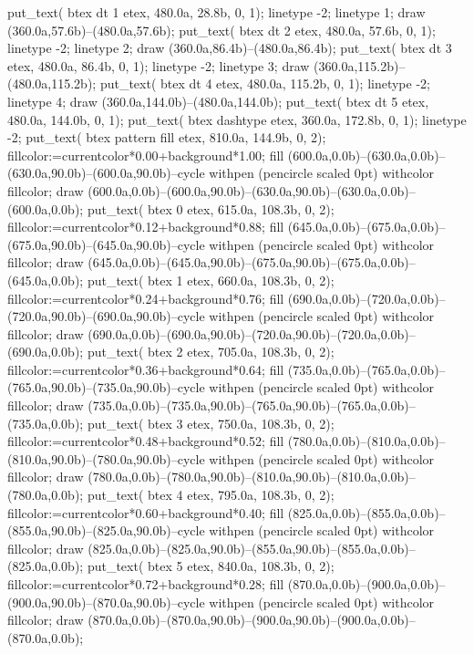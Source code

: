 put_text( btex   dt 1 etex, 480.0a, 28.8b, 0, 1);
linetype -2;
linetype 1;
draw (360.0a,57.6b)--(480.0a,57.6b);
put_text( btex   dt 2 etex, 480.0a, 57.6b, 0, 1);
linetype -2;
linetype 2;
draw (360.0a,86.4b)--(480.0a,86.4b);
put_text( btex   dt 3 etex, 480.0a, 86.4b, 0, 1);
linetype -2;
linetype 3;
draw (360.0a,115.2b)--(480.0a,115.2b);
put_text( btex   dt 4 etex, 480.0a, 115.2b, 0, 1);
linetype -2;
linetype 4;
draw (360.0a,144.0b)--(480.0a,144.0b);
put_text( btex   dt 5 etex, 480.0a, 144.0b, 0, 1);
put_text( btex dashtype etex, 360.0a, 172.8b, 0, 1);
linetype -2;
put_text( btex pattern fill etex, 810.0a, 144.9b, 0, 2);
fillcolor:=currentcolor*0.00+background*1.00;
fill (600.0a,0.0b)--(630.0a,0.0b)--(630.0a,90.0b)--(600.0a,90.0b)--cycle withpen (pencircle scaled 0pt) withcolor fillcolor;
draw (600.0a,0.0b)--(600.0a,90.0b)--(630.0a,90.0b)--(630.0a,0.0b)--(600.0a,0.0b);
put_text( btex  0 etex, 615.0a, 108.3b, 0, 2);
fillcolor:=currentcolor*0.12+background*0.88;
fill (645.0a,0.0b)--(675.0a,0.0b)--(675.0a,90.0b)--(645.0a,90.0b)--cycle withpen (pencircle scaled 0pt) withcolor fillcolor;
draw (645.0a,0.0b)--(645.0a,90.0b)--(675.0a,90.0b)--(675.0a,0.0b)--(645.0a,0.0b);
put_text( btex  1 etex, 660.0a, 108.3b, 0, 2);
fillcolor:=currentcolor*0.24+background*0.76;
fill (690.0a,0.0b)--(720.0a,0.0b)--(720.0a,90.0b)--(690.0a,90.0b)--cycle withpen (pencircle scaled 0pt) withcolor fillcolor;
draw (690.0a,0.0b)--(690.0a,90.0b)--(720.0a,90.0b)--(720.0a,0.0b)--(690.0a,0.0b);
put_text( btex  2 etex, 705.0a, 108.3b, 0, 2);
fillcolor:=currentcolor*0.36+background*0.64;
fill (735.0a,0.0b)--(765.0a,0.0b)--(765.0a,90.0b)--(735.0a,90.0b)--cycle withpen (pencircle scaled 0pt) withcolor fillcolor;
draw (735.0a,0.0b)--(735.0a,90.0b)--(765.0a,90.0b)--(765.0a,0.0b)--(735.0a,0.0b);
put_text( btex  3 etex, 750.0a, 108.3b, 0, 2);
fillcolor:=currentcolor*0.48+background*0.52;
fill (780.0a,0.0b)--(810.0a,0.0b)--(810.0a,90.0b)--(780.0a,90.0b)--cycle withpen (pencircle scaled 0pt) withcolor fillcolor;
draw (780.0a,0.0b)--(780.0a,90.0b)--(810.0a,90.0b)--(810.0a,0.0b)--(780.0a,0.0b);
put_text( btex  4 etex, 795.0a, 108.3b, 0, 2);
fillcolor:=currentcolor*0.60+background*0.40;
fill (825.0a,0.0b)--(855.0a,0.0b)--(855.0a,90.0b)--(825.0a,90.0b)--cycle withpen (pencircle scaled 0pt) withcolor fillcolor;
draw (825.0a,0.0b)--(825.0a,90.0b)--(855.0a,90.0b)--(855.0a,0.0b)--(825.0a,0.0b);
put_text( btex  5 etex, 840.0a, 108.3b, 0, 2);
fillcolor:=currentcolor*0.72+background*0.28;
fill (870.0a,0.0b)--(900.0a,0.0b)--(900.0a,90.0b)--(870.0a,90.0b)--cycle withpen (pencircle scaled 0pt) withcolor fillcolor;
draw (870.0a,0.0b)--(870.0a,90.0b)--(900.0a,90.0b)--(900.0a,0.0b)--(870.0a,0.0b);
